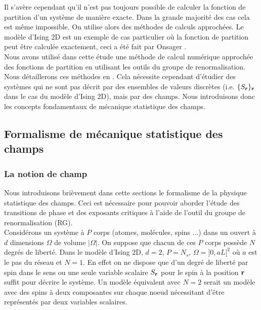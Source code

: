 \documentclass[10.5pt]{article}
\begin{document}
\begin{multicols*}{2}
Il s'avère cependant qu'il n'est pas toujours possible de calculer la fonction de partition d'un système de manière exacte. Dans la grande majorité des cas cela est même impossible. On utilise alors des méthodes de calculs approchées. Le modèle d'Ising 2D est un exemple de cas particulier où la fonction de partition peut être calculée exactement, ceci a été fait par Onsager \cite{Onsager}. \\

Nous avons utilisé dans cette étude une méthode de calcul numérique approchée des fonctions de partition en utilisant les outils du groupe de renormalisation. Nous détaillerons ces méthodes en . Cela nécessite cependant d'étudier des systèmes qui ne sont pas décrit par des ensembles de valeurs discrètes (i.e. $\{S_{\bf r}\}_{\bf r}$ dans le cas du modèle d'Ising 2D), mais par des champs. Nous introduisons donc les concepts fondamentaux de mécanique statistique des champs. \\




\subsection{Formalisme de mécanique statistique des champs}

\label{sec:Origin}

\subsubsection{La notion de champ}

Nous introduisons brièvement dans cette sections le formalisme de la physique statistique \cite{diu2007thermodynamique} des champs. Ceci est nécessaire pour pouvoir aborder l'étude des transitions de phase et des exposants critiques à l'aide de l'outil du groupe de renormalisation (RG). \\

Considérons un système à $P$ corps (atomes, molécules, spins  ...) dans un ouvert à $d$ dimensions $\Omega$ de volume $|\Omega|$. On suppose que chacun de ces $P$ corps possède $N$ degrés de liberté. Dans le modèle d'Ising 2D, $d=2$, $P=N_s$, $\Omega = ]0, aL[^2$ où $a$ est le pas du réseau et $N=1$. En effet on ne dispose que d'un degré de liberté par spin dans le sens ou une seule variable scalaire $S_{\bf r}$ pour le spin à la position ${\bf r}$ suffit pour décrire le système. Un modèle équivalent avec $N=2$ serait un modèle avec des spins à deux composantes sur chaque noeud nécessitant d'être représentés par deux variables scalaires. \\


\end{multicols*}
\end{document}
